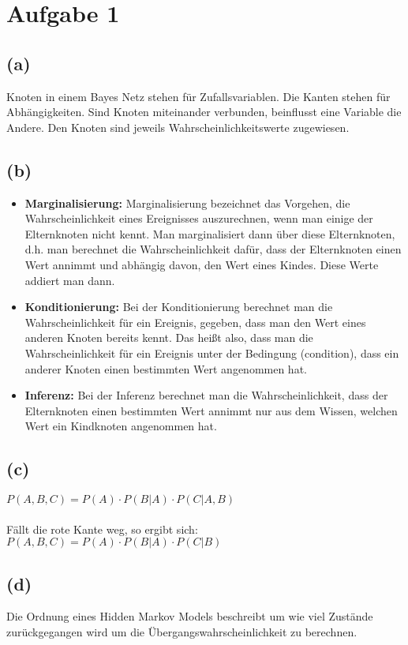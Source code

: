 \documentclass[a4paper]{scrartcl}
\begin{document}
\section*{Aufgabe 1}
\subsection*{(a)}
Knoten in einem Bayes Netz stehen für Zufallsvariablen. Die Kanten stehen für Abhängigkeiten. Sind Knoten miteinander verbunden, beinflusst eine Variable die Andere. Den Knoten sind jeweils Wahrscheinlichkeitswerte zugewiesen.


\subsection*{(b)}
\begin{itemize}
	\item \textbf{Marginalisierung:} Marginalisierung bezeichnet das Vorgehen, die Wahrscheinlichkeit eines Ereignisses auszurechnen, wenn man einige der Elternknoten nicht kennt. Man marginalisiert dann über diese Elternknoten, d.h. man berechnet die Wahrscheinlichkeit dafür, dass der Elternknoten einen Wert annimmt und abhängig davon, den Wert eines Kindes. Diese Werte addiert man dann.
	\item \textbf{Konditionierung:} Bei der Konditionierung berechnet man die Wahrscheinlichkeit für ein Ereignis, gegeben, dass man den Wert eines anderen Knoten bereits kennt. Das heißt also, dass man die Wahrscheinlichkeit für ein Ereignis unter der Bedingung (condition), dass ein anderer Knoten einen bestimmten Wert angenommen hat.
	\item \textbf{Inferenz:} Bei der Inferenz berechnet man die Wahrscheinlichkeit, dass der Elternknoten einen bestimmten Wert annimmt nur aus dem Wissen, welchen Wert ein Kindknoten angenommen hat.
\end{itemize}


\subsection*{(c)}
$P(A,B,C) = P(A) \cdot P(B|A) \cdot P(C|A,B)$\\
\\
Fällt die rote Kante weg, so ergibt sich:\\
$P(A,B,C) = P(A) \cdot P(B|A) \cdot P(C|B)$




\subsection*{(d)}
Die Ordnung eines Hidden Markov Models beschreibt um wie viel Zustände zurückgegangen wird um die Übergangswahrscheinlichkeit zu berechnen. 
\end{document}
